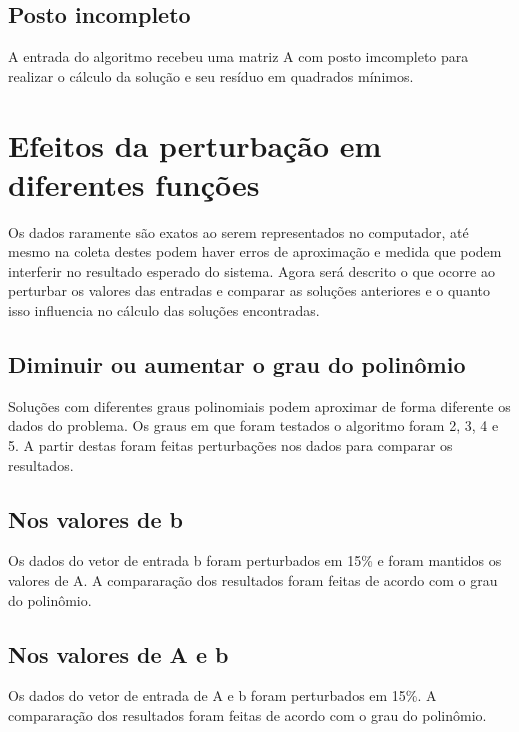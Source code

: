 \section{Posto incompleto}

A entrada do algoritmo recebeu uma matriz A com posto imcompleto para realizar
o cálculo da solução e seu resíduo em quadrados mínimos.


\chapter{Efeitos da perturbação em diferentes funções}
Os dados raramente são exatos ao serem representados no computador, até mesmo na 
coleta destes podem haver erros de aproximação e medida que podem interferir no
resultado esperado do sistema.
Agora será descrito o que ocorre ao perturbar os valores das entradas e 
comparar as soluções anteriores e o quanto isso influencia no cálculo das 
soluções encontradas.

\section{Diminuir ou aumentar o grau do polinômio}
Soluções com diferentes graus polinomiais podem aproximar de forma diferente
os dados do problema.
Os graus em que foram testados o algoritmo foram 2, 3, 4 e 5.
A partir destas foram feitas perturbações nos dados para comparar os resultados.

\section{Nos valores de b}
Os dados do vetor de entrada b foram perturbados em 15\% e foram mantidos os
valores de A.
A compararação dos resultados foram feitas de acordo com o grau do polinômio. 
\section{Nos valores de A e b}

Os dados do vetor de entrada de A e b foram perturbados em 15\%.
A compararação dos resultados foram feitas de acordo com o grau do polinômio.



